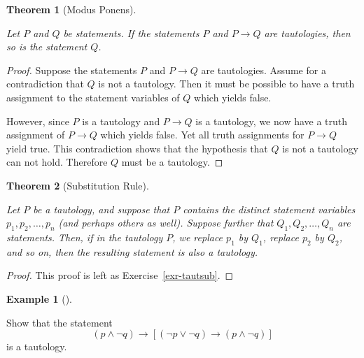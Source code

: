 \documentclass[
  letterpaper,
  10pt,
  reqno,
  twopage,
  openany]{book}
\theoremstyle{plain}
\theoremstyle{definition}
\theoremstyle{definition}
\theoremstyle{definition}
\newtheorem{example}{Example}[chapter]
\theoremstyle{plain}
\theoremstyle{plain}
\newtheorem{theorem}{Theorem}[chapter]
\theoremstyle{remark}
\begin{document}
\leavevmode{}%
\begin{theorem}[Modus Ponens]\label{thm-modpon}

Let \(P\) and \(Q\) be statements. If the statements \(P\) and
\(P\rightarrow Q\) are tautologies, then so is the statement \(Q\).

\end{theorem}

\begin{proof}

Suppose the statements \(P\) and \(P\rightarrow Q\) are tautologies.
Assume for a contradiction that \(Q\) is not a tautology. Then it must
be possible to have a truth assignment to the statement variables of
\(Q\) which yields false.

However, since \(P\) is a tautology and \(P\rightarrow Q\) is a
tautology, we now have a truth assignment of \(P\rightarrow Q\) which
yields false. Yet all truth assignments for \(P\rightarrow Q\) yield
true. This contradiction shows that the hypothesis that \(Q\) is not a
tautology can not hold. Therefore \(Q\) must be a tautology.

\end{proof}

\leavevmode{}%
\begin{theorem}[Substitution Rule]\label{thm-tautsub}

Let \(P\) be a tautology, and suppose that \(P\) contains the distinct
statement variables \(p_1, p_2, \ldots, p_n\) (and perhaps others as
well). Suppose further that \(Q_1, Q_2, \ldots, Q_n\) are statements.
Then, if in the tautology \(P\), we replace \(p_1\) by \(Q_1\), replace
\(p_2\) by \(Q_2\), and so on, then the resulting statement is also a
tautology.

\end{theorem}

\begin{proof}

This proof is left as Exercise~\ref{exr-tautsub}.

\end{proof}

\leavevmode{}%
\begin{example}[]\label{exm-tautology-2}

Show that the statement \begin{equation}
\label{scsex}
(p\land \neg q)\rightarrow [(\neg p\lor \neg q)\rightarrow (p\land \neg q)]
\end{equation} is a tautology.

\end{example}
\end{document}
